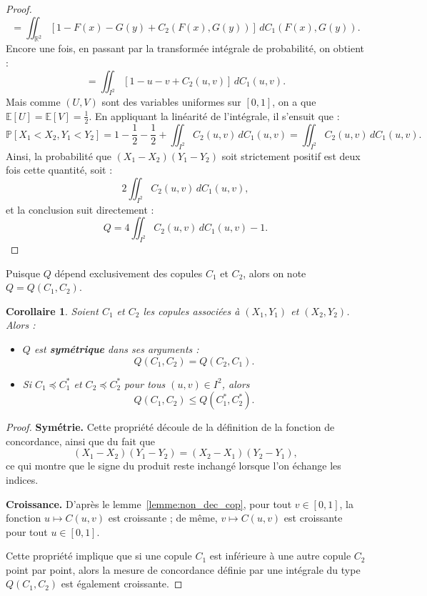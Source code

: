 \documentclass[a4paper,11pt]{amsbook}
\numberwithin{equation}{chapter}
\newtheorem{corollaire}	[theoreme]	 {Corollaire}
\theoremstyle{definition}
\begin{document}
\begin{proof}
\[
= \iint_{\mathbb{R}^2} \left[1 - F(x) - G(y) + C_2(F(x), G(y))\right]\, dC_1(F(x), G(y)).
\]
Encore une fois, en passant par la transformée intégrale de probabilité, on obtient :
\[
= \iint_{I^2} \left[1 - u - v + C_2(u,v)\right]\, dC_1(u,v).
\]
Mais comme $(U, V)$ sont des variables uniformes sur $[0,1]$, on a que $\mathbb{E}[U] = \mathbb{E}[V] = \frac{1}{2}$. En appliquant la linéarité de l’intégrale, il s’ensuit que :
\[
\mathbb{P}[X_1 < X_2, Y_1 < Y_2] = 1 - \frac{1}{2} - \frac{1}{2} + \iint_{I^2} C_2(u,v)\, dC_1(u,v) = \iint_{I^2} C_2(u,v)\, dC_1(u,v).
\]
Ainsi, la probabilité que $(X_1 - X_2)(Y_1 - Y_2)$ soit strictement positif est deux fois cette quantité, soit :
\[
2 \iint_{I^2} C_2(u,v)\, dC_1(u,v),
\]
et la conclusion suit directement :
\[
Q = 4 \iint_{I^2} C_2(u,v)\, dC_1(u,v) - 1.
\]
\end{proof}

Puisque \(Q\) dépend exclusivement des copules \(C_1\) et \(C_2\), alors on note $Q = Q(C_1, C_2)$.


\begin{corollaire}\label{cor:concor}
Soient $C_1$ et $C_2$ les copules associées à $(X_1, Y_1)$ et $(X_2, Y_2)$. Alors :  
\begin{itemize}
    \item \( Q \) est \textbf{symétrique} dans ses arguments :  
    \[
    Q(C_1, C_2) = Q(C_2, C_1).
    \]
    \item Si \( C_1 \preceq C_1^* \) et \( C_2 \preceq C_2^* \) pour tous \( (u,v) \in I^2 \), alors  
    \[
    Q(C_1, C_2) \leq Q(C_1^*, C_2^*).
    \]
\end{itemize}
\end{corollaire}


\begin{proof}

\textbf{Symétrie.}  
Cette propriété découle de la définition de la fonction de concordance, ainsi que du fait que  
\[
(X_1 - X_2)(Y_1 - Y_2) = (X_2 - X_1)(Y_2 - Y_1),
\]
ce qui montre que le signe du produit reste inchangé lorsque l'on échange les indices.

\vspace{1em}

\textbf{Croissance.}  
D’après le lemme~\ref{lemme:non_dec_cop}, pour tout \( v \in [0,1] \), la fonction \( u \mapsto C(u,v) \) est croissante ; de même, \( v \mapsto C(u,v) \) est croissante pour tout \( u \in [0,1] \).

Cette propriété implique que si une copule \( C_1 \) est inférieure à une autre copule \( C_2 \) point par point, alors la mesure de concordance définie par une intégrale du type \( Q(C_1, C_2) \) est également croissante.

\end{proof}
\end{document}
